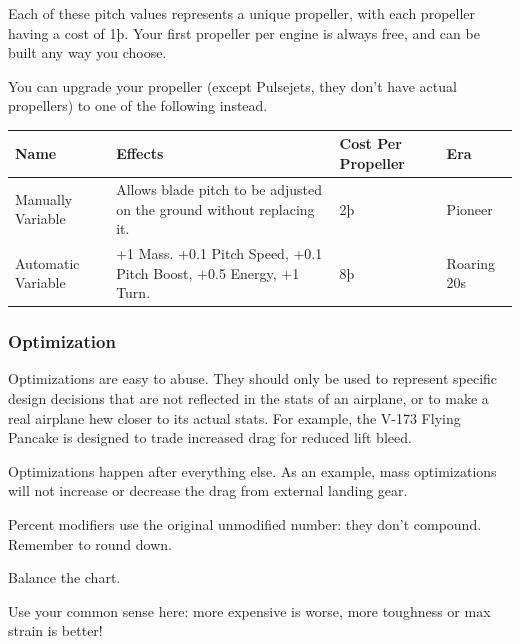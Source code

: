 \documentclass{article}
\begin{document}
Each of these pitch values represents a unique propeller, with
each propeller having a cost of 1þ. Your first propeller per engine is
always free, and can be built any way you choose.

You can upgrade your propeller (except Pulsejets, they don't have actual propellers) to one of the following instead.

\begin{tabular}{|l|l|l|l|}
    \hline
    Name                  & Effects                                           & Cost Per Propeller & Era \\\hline
    Manually Variable     & Allows blade pitch to be adjusted on the ground
    without replacing it. & 2þ                                                & Pioneer                  \\\hline
    Automatic Variable    & +1 Mass. +0.1 Pitch Speed, +0.1 Pitch Boost, +0.5
    Energy, +1 Turn.      & 8þ                                                & Roaring 20s              \\\hline
\end{tabular}

\subsubsection{Optimization}
\label{_Optimization}

Optimizations are easy to abuse. They should only be used to represent
specific design decisions that are not reflected in the stats of an
airplane, or to make a real airplane hew closer to its actual stats. For
example, the V-173 Flying Pancake is designed to trade increased drag
for reduced lift bleed.

Optimizations happen after everything else. As an example, mass
optimizations will not increase or decrease the drag from external
landing gear.

Percent modifiers use the original unmodified number: they don't
compound. Remember to round down.

Balance the chart.

Use your common sense here: more expensive is worse, more toughness or
max strain is better!
\end{document}
